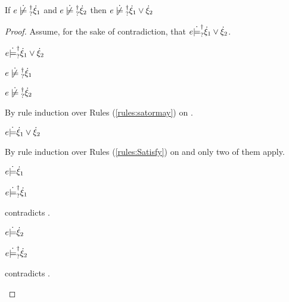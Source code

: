 \begin{lemma}
  \label{lem:or-nn-satisfy}
  If $\cnotsatisfyormay{e}{\hxi_1}$ and $\cnotsatisfyormay{e}{\hxi_2}$ then $\cnotsatisfyormay{e}{\cor{\hxi_1}{\hxi_2}}$
\end{lemma}
\begin{proof}
  Assume, for the sake of contradiction, that $e \dot{\models}_{?}^{\dag} \dot{\xi}_1 \vee \dot{\xi}_2$.
\begin{pfsteps*}
\item $e \dot{\models}_{?}^{\dag} \dot{\xi}_1 \vee \dot{\xi}_2$  
\item $\cnotsatisfyormay{e}{\hxi_1}$  
\item $\cnotsatisfyormay{e}{\hxi_2}$  
\end{pfsteps*}
By rule induction over Rules (\ref{rules:satormay}) on .
\begin{byCases}

\item[\text{(\ref{rule:CSMSSat})}]
  \begin{pfsteps*}
  \item $e \dot{\models} \dot{\xi}_1 \vee \dot{\xi}_2$  
  \end{pfsteps*}
  By rule induction over Rules (\ref{rules:Satisfy}) on  and only two of them apply.
  \begin{byCases}

  \item[\text{(\ref{rule:CSOr1})}]
    \begin{pfsteps*}
    \item $e \dot{\models} \dot{\xi}_1$  
    \item $e \dot{\models}_{?}^{\dag} \dot{\xi}_1$  
    \end{pfsteps*}
     contradicts .

  \item[\text{(\ref{rule:CSOr2})}]
    \begin{pfsteps*}
    \item $e \dot{\models} \dot{\xi}_2$  
    \item $e \dot{\models}_{?}^{\dag} \dot{\xi}_2$  
    \end{pfsteps*}
     contradicts .


\end{byCases}
\end{byCases}
\end{proof}
